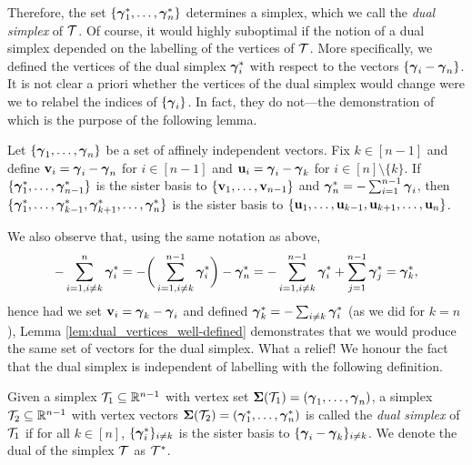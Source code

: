 Therefore, the set $\{\vb*{\gamma}^*_1,\dots,\vb*{\gamma}^*_n\}$ determines a simplex, which we call the \emph{dual simplex} of $\mathcal{T}$. Of course, it would highly suboptimal if the notion of a dual simplex depended on the labelling of the vertices of $\mathcal{T}$. More specifically, we defined the vertices of the dual simplex $\vb*{\gamma}^*_i$ with respect to the vectors $\{\vb*{\gamma}_i-\vb*{\gamma}_n\}$. It is not clear a priori whether the vertices of the dual simplex would change were we to relabel the indices of $\{\vb*{\gamma}_i\}$. In fact, they do not---the demonstration of which is the purpose of the following lemma. 

\begin{lemma}
	\label{lem:dual_vertices_well-defined}
	Let $\{\vb*{\gamma}_1,\dots,\vb*{\gamma}_n\}$ be a set of affinely independent vectors. Fix $k\in [n-1]$ and define $\vb{v}_i=\vb*{\gamma}_i-\vb*{\gamma}_n$ for $i\in[n-1]$ and $\vb{u}_i=\vb*{\gamma}_i-\vb*{\gamma}_k$ for $i\in[n]\setminus\{k\}$. If $\{\vb*{\gamma}^*_1,\dots,\vb*{\gamma}^*_{n-1}\}$ is the sister basis to $\{\vb{v}_1,\dots,\vb{v}_{n-1}\}$ and $\vb*{\gamma}^*_n = -\sum_{i=1}^{n-1}\vb*{\gamma}_i$, then $\{\vb*{\gamma}^*_1,\dots,\vb*{\gamma}^*_{k-1},\vb*{\gamma}^*_{k+1},\dots,\vb*{\gamma}^*_{n}\}$ is the sister basis to $\{\vb{u}_1,\dots,\vb{u}_{k-1},\vb{u}_{k+1},\dots,\vb{u}_n\}$. 
\end{lemma}


We also observe that, using the same notation as above, 
\[-\sum_{i=1,i\neq k}^n \vb*{\gamma}^
*_i = -\bigg(\sum_{i=1,i\neq k}^{n-1} \vb*{\gamma}^*_i\bigg) - \vb*{\gamma}^*_n = -\sum_{i=1,i\neq k}^{n-1}\vb*{\gamma}^*_i + \sum_{j=1}^{n-1} \vb*{\gamma}^*_j = \vb*{\gamma}^*_k,\]
hence had we set $\vb{v}_i=\vb*{\gamma}_k-\vb*{\gamma}_i$ and defined $\vb*{\gamma}^*_k = -\sum_{i\neq k}\vb*{\gamma}^*_i$ (as we did for $k=n$), Lemma \ref{lem:dual_vertices_well-defined} demonstrates that we would produce the same set of vectors for the dual simplex. What a relief! We honour the fact that the dual simplex is independent of labelling with the following definition. 


\begin{definition}
\label{def:dual_simplex}
Given a simplex $\mathcal{T}_1\subseteq\mathbb{R}^{n-1}$ with vertex set $\boldsymbol{\Sigma}(\mathcal{T}_1)=(\vb*{\gamma}_1,\dots,\vb*{\gamma}_n)$, a simplex $\mathcal{T}_2\subseteq \mathbb{R}^{n-1}$ with vertex vectors $\boldsymbol{\Sigma}(\mathcal{T}_2)=(\vb*{\gamma}^*_1,\dots,\vb*{\gamma}^*_n)$ is called the \emph{dual simplex} of $\mathcal{T}_1$ if for all $k\in[n]$, $\{\vb*{\gamma}^*_i\}_{i\neq k}$ is the sister basis to $\{\vb*{\gamma}_i-\vb*{\gamma}_k\}_{i\neq k}$. We denote the dual of the simplex $\mathcal{T}$ as $\mathcal{T}^*$. 
\end{definition}

